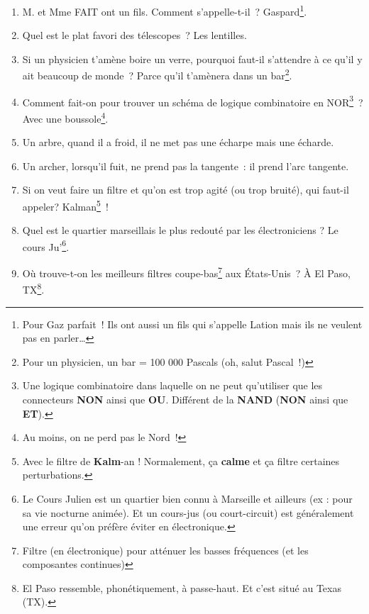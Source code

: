 \documentclass[10pt,a5paper,fullpage]{book}
\begin{document}
\begin{enumerate}
		\textit{\underline{Variante}~: Une prise électrique rend droit comme un} I.\footnote{Le courant est souvent noté I (pour l'intensité) et se mesure en Ampères.} 
		\item M. et Mme FAIT ont un fils. Comment s’appelle-t-il~? Gaspard\footnote{Pour Gaz parfait~! Ils ont aussi un fils qui s’appelle Lation mais ils ne veulent pas en parler\ldots}.
		\item Quel est le plat favori des télescopes~? Les lentilles.
		\item Si un physicien t’amène boire un verre, pourquoi faut-il s’attendre à ce qu’il y ait beaucoup de monde~? Parce qu’il t’amènera dans un bar\footnote{Pour un physicien, un bar = 100 000 Pascals (oh, salut Pascal~!)}.
		\item Comment fait-on pour trouver un schéma de logique combinatoire en NOR\footnote{Une logique combinatoire dans laquelle on ne peut qu’utiliser que les connecteurs \textbf{NON} ainsi que \textbf{OU}. Différent de la \textbf{NAND} (\textbf{NON} ainsi que \textbf{ET}).}~? Avec une boussole\footnote{Au moins, on ne perd pas le Nord~!}.
		\item Un arbre, quand il a froid, il ne met pas une écharpe mais une écharde.
		\item Un archer, lorsqu’il fuit, ne prend pas la tangente~: il prend l’arc tangente.
		\item Si on veut faire un filtre et qu'on est trop agité (ou trop bruité), qui faut-il appeler? Kalman\footnote{Avec le filtre de \textbf{Kalm}-an ! Normalement, ça \textbf{calme} et ça filtre certaines perturbations.}~!
		\item Quel est le quartier marseillais le plus redouté par les électroniciens ? Le cours Ju'\footnote{Le Cours Julien est un quartier bien connu à Marseille et ailleurs (ex : pour sa vie nocturne animée). Et un cours-jus (ou court-circuit) est généralement une erreur qu'on préfère éviter en électronique.}.
 		\item Où trouve-t-on les meilleurs filtres coupe-bas\footnote{Filtre (en électronique) pour atténuer les basses fréquences (et les composantes continues)} aux États-Unis~? À El Paso, TX\footnote{El Paso ressemble, phonétiquement, à passe-haut. Et c'est situé au Texas (TX).}.

\end{enumerate}
\end{document}
